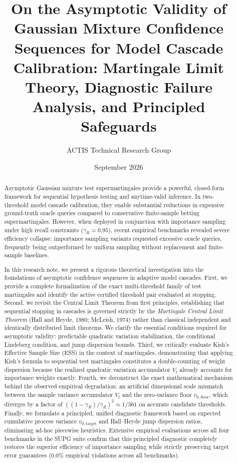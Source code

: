 \documentclass[11pt,a4paper]{article}
\title{\textbf{On the Asymptotic Validity of Gaussian Mixture Confidence Sequences for Model Cascade Calibration: Martingale Limit Theory, Diagnostic Failure Analysis, and Principled Safeguards}}
\author{ACTIS Technical Research Group}
\date{September 2026}
\begin{document}
\maketitle

\begin{abstract}
Asymptotic Gaussian mixture test supermartingales provide a powerful, closed-form framework for sequential hypothesis testing and anytime-valid inference. In two-threshold model cascade calibration, they enable substantial reductions in expensive ground-truth oracle queries compared to conservative finite-sample betting supermartingales. However, when deployed in conjunction with importance sampling under high recall constraints ($\gamma_R = 0.95$), recent empirical benchmarks revealed severe efficiency collapse: importance sampling variants requested excessive oracle queries, frequently being outperformed by uniform sampling without replacement and finite-sample baselines. 

In this research note, we present a rigorous theoretical investigation into the foundations of asymptotic confidence sequences in adaptive model cascades. First, we provide a complete formalization of the exact multi-threshold family of test martingales and identify the active certified threshold pair evaluated at stopping. Second, we revisit the Central Limit Theorem from first principles, establishing that sequential stopping in cascades is governed strictly by the \emph{Martingale Central Limit Theorem} (Hall and Heyde, 1980; McLeish, 1974) rather than classical independent and identically distributed limit theorems. We clarify the essential conditions required for asymptotic validity: predictable quadratic variation stabilization, the conditional Lindeberg condition, and jump dispersion bounds. Third, we critically evaluate Kish's Effective Sample Size (ESS) in the context of martingales, demonstrating that applying Kish's formula to sequential test martingales constitutes a double-counting of weight dispersion because the realized quadratic variation accumulator $V_t$ already accounts for importance weights exactly. Fourth, we deconstruct the exact mathematical mechanism behind the observed empirical degradation: an artificial dimensional scale mismatch between the sample variance accumulator $V_t$ and the zero-variance floor $v_{0, \text{floor}}$, which diverges by a factor of $((1 - \gamma_R)/\gamma_R)^2 \approx 1/361$ on accurate candidate thresholds. Finally, we formulate a principled, unified diagnostic framework based on expected cumulative process variance $v_{0, \text{target}}$ and Hall--Heyde jump dispersion ratios, eliminating ad-hoc piecewise heuristics. Extensive empirical evaluations across all four benchmarks in the SUPG suite confirm that this principled diagnostic completely restores the superior efficiency of importance sampling while strictly preserving target error guarantees ($0.0\%$ empirical violations across all benchmarks).
\end{abstract}
\end{document}
